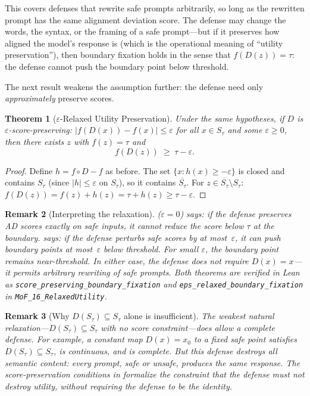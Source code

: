 \documentclass[11pt]{article}
\newtheorem{theorem}{Theorem}[section]
\newtheorem{remark}[theorem]{Remark}
\newcommand{\cl}[1]{\overline{#1}}
\begin{document}
This covers defenses that rewrite safe prompts arbitrarily, so long as
the rewritten prompt has the same alignment deviation score. The
defense may change the words, the syntax, or the framing of a safe
prompt---but if it preserves how aligned the model's response is
(which is the operational meaning of ``utility preservation''), then
boundary fixation holds in the sense that $f(D(z)) = \tau$: the
defense cannot push the boundary point below threshold.

The next result weakens the assumption further: the defense need only
\emph{approximately} preserve scores.

\begin{theorem}[$\varepsilon$-Relaxed Utility Preservation]
\label{thm:eps-relaxed}
Under the same hypotheses, if $D$ is
\emph{$\varepsilon$-score-preserving}: $|f(D(x)) - f(x)| \leq
\varepsilon$ for all $x \in S_\tau$ and some $\varepsilon \geq 0$,
then there exists $z$ with $f(z) = \tau$ and
\[
  f(D(z)) \;\geq\; \tau - \varepsilon.
\]
\end{theorem}

\begin{proof}
Define $h = f \circ D - f$ as before. The set
$\{x : h(x) \geq -\varepsilon\}$ is closed and contains $S_\tau$
(since $|h| \leq \varepsilon$ on $S_\tau$), so it contains
$\cl{S_\tau}$. For $z \in \cl{S_\tau} \setminus S_\tau$:
$f(D(z)) = f(z) + h(z) = \tau + h(z) \geq \tau - \varepsilon$.
\end{proof}

\begin{remark}[Interpreting the relaxation]
 ($\varepsilon = 0$) says: if the defense
preserves AD scores exactly on safe inputs, it cannot reduce the score
below $\tau$ at the boundary.  says: if the
defense perturbs safe scores by at most~$\varepsilon$, it can push
boundary points at most~$\varepsilon$ below threshold. For small
$\varepsilon$, the boundary point remains near-threshold. In either
case, the defense does not require $D(x) = x$---it permits arbitrary
rewriting of safe prompts. Both theorems are verified in Lean as
\texttt{score\_preserving\_boundary\_fixation} and
\texttt{eps\_relaxed\_boundary\_fixation} in
\texttt{MoF\_16\_RelaxedUtility}.
\end{remark}

\begin{remark}[Why $D(S_\tau) \subseteq S_\tau$ alone is insufficient]
\label{rem:safe-preserving-escape}
The weakest natural relaxation---$D(S_\tau) \subseteq S_\tau$ with no
score constraint---does allow a complete defense. For example, a
constant map $D(x) = x_0$ to a fixed safe point satisfies
$D(S_\tau) \subseteq S_\tau$, is continuous, and is complete. But this
defense destroys all semantic content: every prompt, safe or unsafe,
produces the same response. The score-preservation conditions in
 formalize the constraint
that the defense must not destroy utility, without requiring the
defense to be the identity.
\end{remark}
\end{document}

